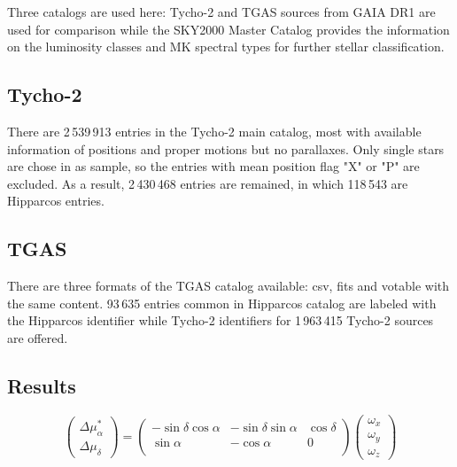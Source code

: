 \documentclass[onecolumn]{aa}   %
\begin{document}
Three catalogs are used here: Tycho-2\citep{2000A&A...355L..27H} and TGAS sources from GAIA DR1 are used for comparison while the SKY2000 Master Catalog\citep{2015yCat.5145....0M} provides the information on the luminosity  classes and MK spectral types for further stellar classification.

\subsection{Tycho-2}
There are 2\,539\,913 entries in the Tycho-2 main catalog, most with available information of positions and proper motions but no parallaxes. Only single stars are chose in as sample, so the entries with mean position flag "X" or  "P" are excluded.  As a result, 2\,430\,468 entries are remained, in which 118\,543 are Hipparcos entries.


\subsection{TGAS}    \label{sec:tgas}
There are three formats of the TGAS catalog available: csv, fits and votable with the same content. 93\,635 entries common in Hipparcos catalog are labeled  with the Hipparcos identifier while  Tycho-2 identifiers for 1\,963\,415 Tycho-2 sources are offered. 

\subsection{Results}   \label{sec:result}


\[ 
\left( \begin{array}{c}
\Delta \mu_\alpha^* \\
\Delta \mu_\delta
\end{array} \right)
 = \left( \begin{array}{ccc}
-\sin\delta \cos\alpha & -\sin\delta \sin\alpha &  \cos\delta \\
  \sin\alpha                 & -\cos\alpha               &  0 \\
\end{array} \right)
\left( \begin{array}{c}
\omega_x \\
\omega_y \\
\omega_z
\end{array} \right)
\] 
\end{document}
